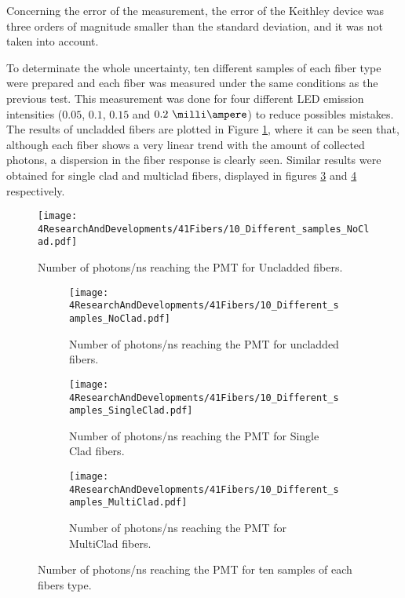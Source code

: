 Concerning the error of the measurement, the error of the Keithley device was three orders of magnitude smaller than the standard deviation, and it was not taken into account.


To determinate the whole uncertainty, ten different samples of each fiber type were prepared and each fiber was measured under the same conditions as the previous test. This measurement was done for four different LED emission intensities ($0.05$, $0.1$, $0.15$ and $0.2~\milli\ampere$) to reduce possibles mistakes. The results of uncladded fibers are plotted in Figure \ref{fig:10samplesNC}, where it can be seen that, although each fiber shows a very linear trend with the amount of collected photons, a dispersion in the fiber response is clearly seen. Similar results were obtained for single clad and multiclad fibers, displayed in figures \ref{subfig:10samplesSC} and \ref{subfig:10samplesMC} respectively.

\begin{figure}[h]
\centering
\texttt{[image: 4ResearchAndDevelopments/41Fibers/10\_Different\_samples\_NoClad.pdf]}
\caption{Number of photons/ns reaching the PMT for Uncladded fibers.\label{fig:10samplesNC}}
\end{figure}

\begin{figure}
\centering
    \begin{subfigure}[b]{0.6\textwidth}
    \centering
    \texttt{[image: 4ResearchAndDevelopments/41Fibers/10\_Different\_samples\_NoClad.pdf]}  
    \caption{Number of photons/ns reaching the PMT for uncladded fibers.\label{subfig:10samplesNC}}
    \end{subfigure}
    \hfill
    \begin{subfigure}[b]{0.6\textwidth}
    \centering
    \texttt{[image: 4ResearchAndDevelopments/41Fibers/10\_Different\_samples\_SingleClad.pdf]}  
    \caption{Number of photons/ns reaching the PMT for Single Clad fibers.\label{subfig:10samplesSC}}
    \end{subfigure}
    \hfill
    \begin{subfigure}[b]{0.6\textwidth}
    \centering
    \texttt{[image: 4ResearchAndDevelopments/41Fibers/10\_Different\_samples\_MultiClad.pdf]}  
    \caption{Number of photons/ns reaching the PMT for MultiClad fibers.\label{subfig:10samplesMC}}
    \end{subfigure}
 \caption{Number of photons/ns reaching the PMT for ten samples of each fibers type.}
 \label{fig:10samplesThreeTypes}
\end{figure}

